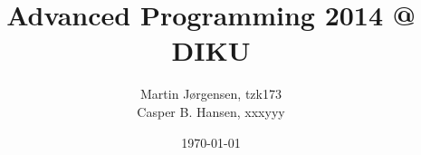 \documentclass[a4paper,12pt]{article}
\title{Advanced Programming 2014 @ DIKU}
\author{Martin Jørgensen, tzk173\\
        Casper B. Hansen, xxxyyy}
\date{\today}
\begin{document}
\maketitle

\tableofcontents
\pagebreak






\end{document}
